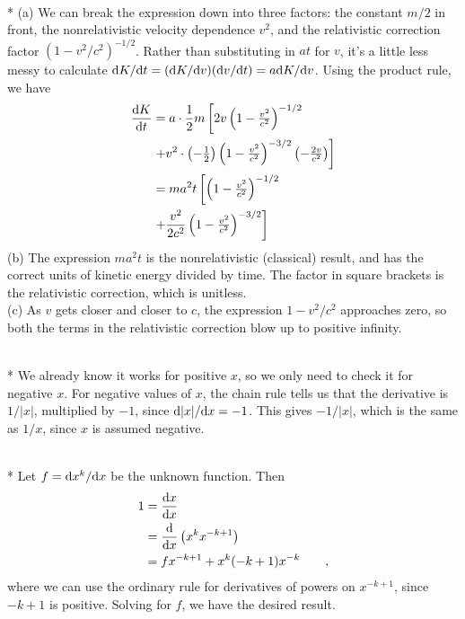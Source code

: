 \\*
(a) We can break the expression down into three factors: the constant $m/2$ in front,
the nonrelativistic velocity dependence $v^2$, and the relativistic correction
factor $(1-v^2/c^2)^{-1/2}$. Rather than substituting in $at$ for $v$, it's a little less
messy to calculate $\textup{d} K/\textup{d} t=(\textup{d} K/\textup{d} v)(\textup{d} v/\textup{d} t)=a\textup{d} K/\textup{d} v$. Using the product rule, we have
\begin{align*}
  \frac{\textup{d} K}{\textup{d} t} &= a\cdot\frac{1}{2}m\left[2v\left(1-{\textstyle \frac{v^2}{c^2}}\right)^{-1/2}\right.\\
                              &\left.+v^2\cdot{\textstyle \left(-\frac{1}{2}\right)}\left(1-{\textstyle \frac{v^2}{c^2}}\right)^{-3/2}
                                        {\textstyle \left(-\frac{2v}{c^2}\right)}\right] \\
             &=  ma^2t\left[\left(1-{\textstyle \frac{v^2}{c^2}}\right)^{-1/2}\right.\\
                              &\left.+\frac{v^2}{2c^2}\left(1-{\textstyle \frac{v^2}{c^2}}\right)^{-3/2}\right]
\end{align*}
(b) The expression $ma^2t$ is the nonrelativistic (classical) result, and has the correct units of
kinetic energy divided by time. The factor in square brackets is the relativistic correction,
which is unitless.\\
(c) As $v$ gets closer and closer to $c$, the expression $1-v^2/c^2$ approaches zero, so both the
terms in the relativistic correction blow up to positive infinity.

\\*
We already know it works for positive $x$, so we only need to check it for negative $x$.
For negative values of $x$, the chain rule tells us that the derivative is $1/|x|$,
multiplied by $-1$, since $\textup{d}|x|/\textup{d} x=-1$. This gives $-1/|x|$, which is the same
as $1/x$, since $x$ is assumed negative.

\pagebreak[4]\\*
Let $f=\textup{d} x^k/\textup{d} x$ be the unknown function. Then
\begin{align*}
  1 &= \frac{\textup{d} x}{\textup{d} x} \\
    &= \frac{\textup{d} }{\textup{d} x} \left(x^kx^{-k+1}\right) \\
    &= fx^{-k+1}+x^k(-k+1)x^{-k} \qquad ,
\end{align*}
where we can use the ordinary rule for derivatives of powers on $x^{-k+1}$, since $-k+1$ is positive. Solving for
$f$, we have the desired result.


